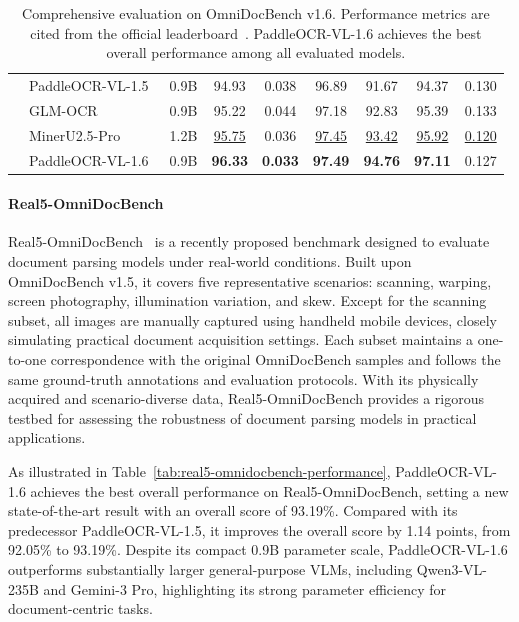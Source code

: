 \documentclass[11pt, a4paper,logo,  copyright, nonumbering]{paddleocr}
\begin{document}
\begin{table}[!t]
{\begin{tabular}{l|ll|c|c c c c c}
        & PaddleOCR-VL-1.5~\cite{cui2026paddleocrvl15multitask09bvlm} & 0.9B & 94.93 & 0.038 & 96.89 & 91.67 & 94.37 & 0.130 \\
        & GLM-OCR~\cite{duan2026glmocrtechnicalreport} & 0.9B & 95.22 & 0.044 & 97.18 & 92.83 & 95.39 & 0.133 \\
        & MinerU2.5-Pro~\cite{MinerU25Pro} & 1.2B & \cellcolor{cyan!15}\underline{95.75} & 0.036 & \cellcolor{cyan!15}\underline{97.45} & \cellcolor{cyan!15}\underline{93.42} & \cellcolor{cyan!15}\underline{95.92} & \cellcolor{cyan!15}\underline{0.120} \\
        & PaddleOCR-VL-1.6 & 0.9B & \cellcolor{red!15}\textbf{96.33} & \cellcolor{red!15}\textbf{0.033} & \cellcolor{red!15}\textbf{97.49} & \cellcolor{red!15}\textbf{94.76} & \cellcolor{red!15}\textbf{97.11} & 0.127 \\
        \bottomrule
    \end{tabular}%
    }
    \caption{Comprehensive evaluation on OmniDocBench v1.6. Performance metrics are cited from the official leaderboard~\cite{omni1.6}. PaddleOCR-VL-1.6 achieves the best overall performance among all evaluated models.}
    \label{tab:omni16_full_performance}
\end{table}

\paragraph{Real5-OmniDocBench}

Real5-OmniDocBench~\cite{zhou2026real5omnidocbenchfullscalephysicalreconstruction} is a recently proposed benchmark designed to evaluate document parsing models under real-world conditions. Built upon OmniDocBench v1.5, it covers five representative scenarios: scanning, warping, screen photography, illumination variation, and skew. Except for the scanning subset, all images are manually captured using handheld mobile devices, closely simulating practical document acquisition settings. Each subset maintains a one-to-one correspondence with the original OmniDocBench samples and follows the same ground-truth annotations and evaluation protocols. With its physically acquired and scenario-diverse data, Real5-OmniDocBench provides a rigorous testbed for assessing the robustness of document parsing models in practical applications. 


As illustrated in Table~\ref{tab:real5-omnidocbench-performance}, PaddleOCR-VL-1.6 achieves the best overall performance on Real5-OmniDocBench, setting a new state-of-the-art result with an overall score of 93.19\%. Compared with its predecessor PaddleOCR-VL-1.5, it improves the overall score by 1.14 points, from 92.05\% to 93.19\%. Despite its compact 0.9B parameter scale, PaddleOCR-VL-1.6 outperforms substantially larger general-purpose VLMs, including Qwen3-VL-235B and Gemini-3 Pro, highlighting its strong parameter efficiency for document-centric tasks. 
\end{document}
